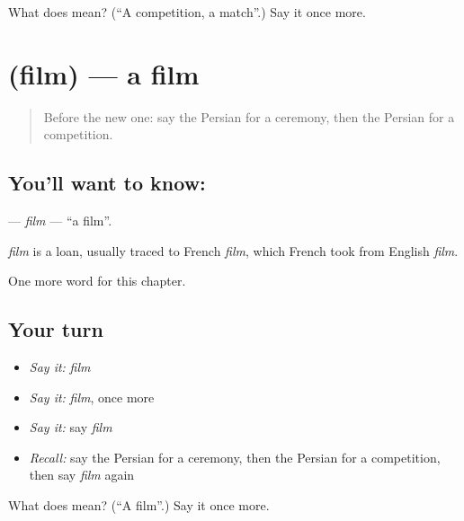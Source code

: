 \begin{tcolorbox}[breakable,colback=teal!4,colframe=teal!35!black,title={Before you move on}]
What does  mean? (\textquotedblleft{}A competition, a match\textquotedblright{}.) Say it once more.
\end{tcolorbox}
\section[\texorpdfstring{\fa{فیلم} (film)}{فیلم (film)}]{ (film) — a film}

\label{lesson:FA-C243-film}



\begin{quote}
Before the new one: say the Persian for a ceremony, then the Persian for a competition.
\end{quote}

\subsection*{You'll want to know: }
\textbf{} — \emph{film} — \textquotedblleft{}a film\textquotedblright{}.

\begin{cousinweb}
\emph{film} is a loan, usually traced to French \emph{film}, which French took from English \emph{film}.
\end{cousinweb}

\begin{grammarlens}[title={What you've built}]
One more word for this chapter.
\end{grammarlens}

\subsection*{Your turn}
\begin{itemize}
\raggedright
  \item \emph{Say it:} \emph{film}
  \item \emph{Say it:} \emph{film}, once more
  \item \emph{Say it:} say \emph{film}
  \item \emph{Recall:} say the Persian for a ceremony, then the Persian for a competition, then say \emph{film} again
\end{itemize}

\begin{tcolorbox}[breakable,colback=teal!4,colframe=teal!35!black,title={Before you move on}]
What does  mean? (\textquotedblleft{}A film\textquotedblright{}.) Say it once more.
\end{tcolorbox}
